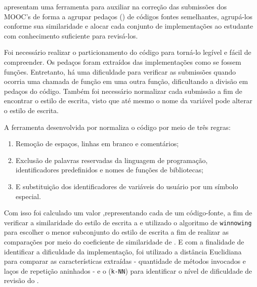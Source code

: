 	     apresentam uma ferramenta para auxiliar na correção das
	    submissões dos MOOC's de forma a agrupar pedaços () de códigos
	    fontes semelhantes, agrupá-los conforme sua similaridade e alocar cada conjunto
	    de implementações ao estudante com conhecimento suficiente para revisá-los.
	    
	    Foi necessário realizar o particionamento do código para torná-lo legível
	    e fácil de compreender. Os pedaços foram extraídos das implementações como
	    se fossem funções. Entretanto, há uma dificuldade para verificar as submissões
	    quando ocorria uma chamada de função em uma outra função, dificultando a divisão
	    em pedaços do código. Também foi necessário normalizar cada submissão a fim de
	    encontrar o estilo de escrita, visto que até mesmo o nome da variável pode
	    alterar o estilo de escrita.
	    
	    A ferramenta desenvolvida por  normaliza o código por
	    meio de três regras:
	    
	    \begin{enumerate}
	    	\item Remoção de espaços, linhas em branco e comentários;
	    	\item Exclusão de palavras reservadas da linguagem de programação,
	    	identificadores predefinidos e nomes de funções de bibliotecas;
	    	\item E substituição dos identificadores de variáveis do usuário por um
	    	símbolo especial.
	    \end{enumerate}
	    
	    Com isso foi calculado um valor ,representando cada 
	    de um código-fonte, a fim de verificar a similaridade do estilo de escrita 
	    a  e utilizado o algoritmo de \texttt{winnowing} \cite{schleimer2003}
	    para escolher o menor subconjunto do estilo de escrita a fim de realizar as
	    comparações por meio do coeficiente de similaridade de  \cite{jaccard1901}. E
	    com a finalidade de identificar a dificuldade da implementação, foi utilizado
	    a distância Euclidiana para comparar as características extraídas - quantidade
	    de métodos invocados e laços de repetição aninhados - e o 
	    (\texttt{k-NN}) para identificar o nível de dificuldade de revisão do
	    .
	    

